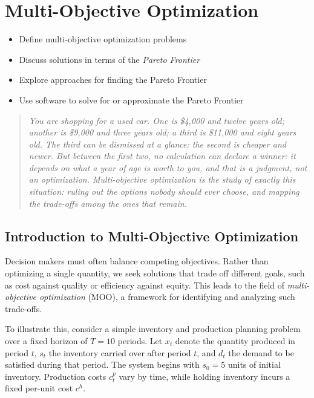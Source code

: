 \chapter{Multi-Objective Optimization}
\label{ch:multi-objective}

\begin{outcome}
\begin{itemize}
    \item Define multi-objective optimization problems
    \item Discuss solutions in terms of the \emph{Pareto Frontier}
    \item Explore approaches for finding the Pareto Frontier
    \item Use software to solve for or approximate the Pareto Frontier
\end{itemize}
\end{outcome}

\begin{quote}
\itshape You are shopping for a used car. One is \$4{,}000 and twelve years old; another is \$9{,}000 and three years old; a third is \$11{,}000 and eight years old. The third can be dismissed at a glance: the second is cheaper \emph{and} newer. But between the first two, no calculation can declare a winner: it depends on what a year of age is worth to you, and that is a judgment, not an optimization. Multi-objective optimization is the study of exactly this situation: ruling out the options nobody should ever choose, and mapping the trade-offs among the ones that remain.
\end{quote}

\section{Introduction to Multi-Objective Optimization}

Decision makers must often balance competing objectives. Rather than optimizing a single quantity, we seek solutions that trade off different goals, such as cost against quality or efficiency against equity. This leads to the field of \emph{multi-objective optimization} (MOO), a framework for identifying and analyzing such trade-offs.

To illustrate this, consider a simple inventory and production planning problem over a fixed horizon of \(T = 10\) periods. Let \(x_t\) denote the quantity produced in period \(t\), \(s_t\) the inventory carried over after period \(t\), and \(d_t\) the demand to be satisfied during that period. The system begins with \(s_0 = 5\) units of initial inventory. Production costs \(c^p_t\) vary by time, while holding inventory incurs a fixed per-unit cost \(c^h\).

